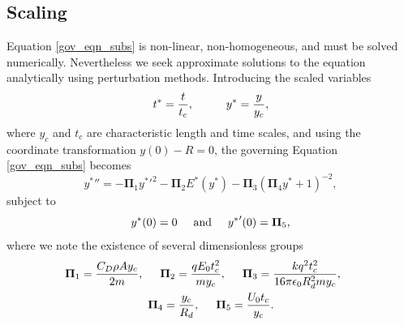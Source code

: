 \documentclass[aip,reprint, floatfix]{revtex4-1}
\begin{document}
\subsection{Scaling}
Equation \ref{gov_eqn_subs} is non-linear, non-homogeneous, and must be solved numerically. Nevertheless we seek approximate solutions to the equation analytically using perturbation methods. Introducing the scaled variables
\begin{equation}
 t^* = \frac{t}{t_c}, \hspace{10 mm} y^* = \frac{y}{y_c}, \end{equation}
where $y_c$ and $t_c$ are characteristic length and time scales, and using the coordinate transformation $y(0) - R = 0$, the governing Equation \ref{gov_eqn_subs} becomes
\begin{equation}
\label{pi_terms}
 {y^*}'' = - \mathbf{\Pi}_1 {y^*}'^2
- \mathbf{\Pi}_2 E^* ( {y^*} ) 
- \mathbf{\Pi}_3 \left( \mathbf{\Pi}_4 {y^*} + 1 \right)^{-2},
\end{equation}
subject to
\begin{equation*}
{y^*}(0) = 0 \hspace{5 mm} \mbox{and} \hspace{5 mm} {y^*}'(0) = \mathbf{\Pi}_5,
\end{equation*}
where we note the existence of several dimensionless groups
\begin{gather*}
\mathbf{\Pi}_1 = \frac{C_D \rho A y_c}{2 m}, \hspace{5 mm}
\mathbf{\Pi}_2 = \frac{q E_0 t_c^2}{m y_c}, \hspace{5 mm}
\mathbf{\Pi}_3 = \frac{k q^2 t_c^2}{16 \pi \epsilon_0 R_d^2 m y_c}, \hspace{5 mm}\\
\mathbf{\Pi}_4 = \frac{y_c}{R_d}, \hspace{5 mm}
\mathbf{\Pi}_5 = \frac{U_0 t_c}{y_c}.
\end{gather*}
\end{document}
